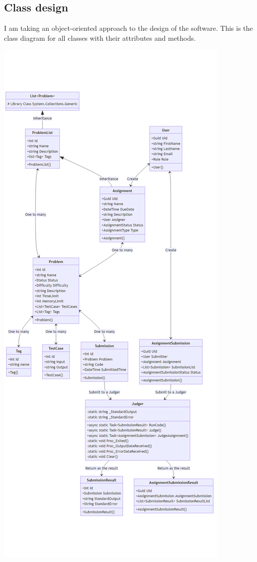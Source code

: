 \documentclass[a4paper]{report}
\begin{document}
\subsection{Class design}

I am taking an object-oriented approach to the design of the software. This is the class diagram for all classes with their attributes and methods.

\includegraphics[width=\textwidth, height=\textheight, keepaspectratio]{classDiagram}
\end{document}

